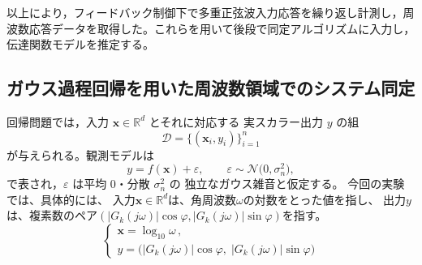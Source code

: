 以上により，フィードバック制御下で多重正弦波入力応答を繰り返し計測し，周波数応答データを取得した。これらを用いて後段で同定アルゴリズムに入力し，伝達関数モデルを推定する。

\subsection{ガウス過程回帰を用いた周波数領域でのシステム同定}
\label{sec:gp_setting}
回帰問題では，入力 $\boldsymbol{x}\in\mathbb{R}^{d}$ とそれに対応する
実スカラー出力 $y$ の組
{\small
\begin{equation}
        \label{eq:gp_regression}
        \mathcal{D}=\{(\boldsymbol{x}_{i},y_{i})\}_{i=1}^{n}
\end{equation}
}
が与えられる。観測モデルは
{\small
\begin{equation}
        y=f(\boldsymbol{x})+\varepsilon,
        \qquad
        \varepsilon\sim\mathcal{N}\!\bigl(0,\sigma_{n}^{2}\bigr),
        \label{eq:gpr_obs}
\end{equation}
}
で表され，$\varepsilon$ は平均 $0$・分散 $\sigma_{n}^{2}$ の
独立なガウス雑音と仮定する。
今回の実験では、具体的には、
入力$\boldsymbol{x}\in\mathbb{R}^{d}$は、角周波数\(\omega\)の対数をとった値を指し、
出力$y$は、複素数のペア\((|G_k(j\omega)|\cos\varphi, |G_k(j\omega)|\sin\varphi)\)を指す。
{\small
\begin{equation}
\label{eq:gp_setting}
\begin{cases}
  \displaystyle \mathbf{x} = \log_{10}\omega\,,\\[0.5em]
  \displaystyle y = \bigl(|G_k(j\omega)|\cos\varphi,\;|G_k(j\omega)|\sin\varphi\bigr)
\end{cases}
\end{equation}
}


